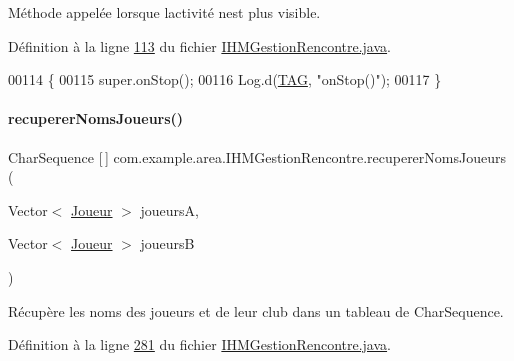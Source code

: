Méthode appelée lorsque l\textquotesingle{}activité n\textquotesingle{}est plus visible. 



Définition à la ligne \hyperlink{_i_h_m_gestion_rencontre_8java_source_l00113}{113} du fichier \hyperlink{_i_h_m_gestion_rencontre_8java_source}{I\+H\+M\+Gestion\+Rencontre.\+java}.


\begin{DoxyCode}
00114     \{
00115         super.onStop();
00116         Log.d(\hyperlink{classcom_1_1example_1_1area_1_1_i_h_m_gestion_rencontre_a0ac4d9152d48619cd697c8c69166219f}{TAG}, \textcolor{stringliteral}{"onStop()"});
00117     \}
\end{DoxyCode}
\mbox{\label{classcom_1_1example_1_1area_1_1_i_h_m_gestion_rencontre_ae68b1e5d73d33d01e622a736a25da731}} 
\paragraph{\texorpdfstring{recuperer\+Noms\+Joueurs()}{recupererNomsJoueurs()}}
{\footnotesize\ttfamily Char\+Sequence \mbox{[}$\,$\mbox{]} com.\+example.\+area.\+I\+H\+M\+Gestion\+Rencontre.\+recuperer\+Noms\+Joueurs (\begin{DoxyParamCaption}\item[{Vector$<$ \hyperlink{classcom_1_1example_1_1area_1_1_joueur}{Joueur} $>$}]{joueursA,  }\item[{Vector$<$ \hyperlink{classcom_1_1example_1_1area_1_1_joueur}{Joueur} $>$}]{joueursB }\end{DoxyParamCaption})\hspace{0.3cm}{\ttfamily [private]}}



Récupère les noms des joueurs et de leur club dans un tableau de Char\+Sequence. 



Définition à la ligne \hyperlink{_i_h_m_gestion_rencontre_8java_source_l00281}{281} du fichier \hyperlink{_i_h_m_gestion_rencontre_8java_source}{I\+H\+M\+Gestion\+Rencontre.\+java}.



